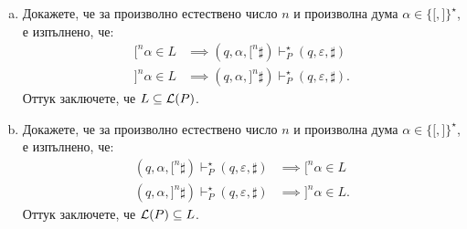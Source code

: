 \begin{extra}
\begin{example}
  \begin{enumerate}[a)]
  \item
    Докажете, че за произволно естествено число $n$ и произволна дума $\alpha \in \{\texttt{[}, \texttt{]}\}^\star$, е изпълнено, че:
    \begin{align*}
      \texttt{[}^n\alpha \in L & \implies (q, \alpha, \texttt{[}^n\sharp) \vdash^\star_P (q, \varepsilon, \sharp)\\
      \texttt{]}^n\alpha \in L & \implies (q, \alpha, \texttt{]}^n\sharp) \vdash^\star_P (q, \varepsilon, \sharp).
    \end{align*}
    Оттук заключете, че $L \subseteq \mathcal{L}(P)$.
  \item
    Докажете, че за произволно естествено число $n$ и произволна дума $\alpha \in \{\texttt{[}, \texttt{]}\}^\star$, е изпълнено, че:
    \begin{align*}
      (q, \alpha, \texttt{[}^n\sharp) \vdash^\star_P (q, \varepsilon, \sharp) & \implies \texttt{[}^n\alpha \in L\\
      (q, \alpha, \texttt{]}^n\sharp) \vdash^\star_P (q, \varepsilon, \sharp) & \implies \texttt{]}^n\alpha \in L.
    \end{align*}
    Оттук заключете, че $\mathcal{L}(P) \subseteq L$.
  \end{enumerate}
\end{example}


\end{extra}
